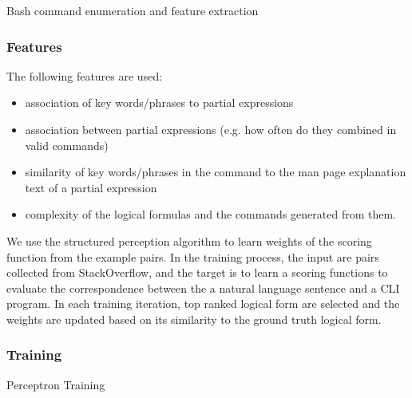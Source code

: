\begin{algorithm} [ht]
\caption{Bash command enumeration and feature extraction\label{alg:decoding}}

\end{algorithm}

\subsubsection{Features}
\label{subsec:feature}
The following features are used:
\begin{itemize}\itemsep-1pt
	\item association of key words/phrases to partial expressions
	\item association between partial expressions (e.g. how often do they combined in valid commands)
	\item similarity of key words/phrases in the command to the man page explanation text of a partial expression
	\item complexity of the logical formulas and the commands generated from them.
\end{itemize}
We use the structured perception algorithm to learn weights of the scoring function from the example pairs. In the training process, the input are pairs collected from StackOverflow, and the target is to learn a scoring functions to evaluate the correspondence between the a natural language sentence and a CLI program. In each training iteration, top ranked logical form are selected and the weights are updated based on its similarity to the ground truth logical form. 

\subsubsection{Training}
\label{subsec:training}

\begin{algorithm} 
\label{alg:training}
\caption{Perceptron Training}
\end{algorithm}